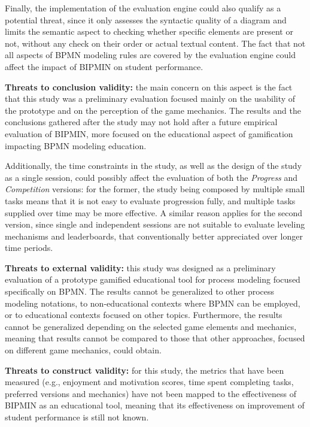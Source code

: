 Finally, the implementation of the evaluation engine could also qualify as a potential threat, since it only assesses the syntactic quality of a diagram and limits the semantic aspect to checking whether specific elements are present or not, without any check on their order or actual textual content. The fact that not all aspects of BPMN modeling rules are covered by the evaluation engine could affect the impact of BIPMIN on student performance.

\textbf{Threats to conclusion validity:} the main concern on this aspect is the fact that this study was a preliminary evaluation focused mainly on the usability of the prototype and on the perception of the game mechanics. The results and the conclusions gathered after the study may not hold after a future empirical evaluation of BIPMIN, more focused on the educational aspect of gamification impacting BPMN modeling education.

Additionally, the time constraints in the study, as well as the design of the study as a single session, could possibly affect the evaluation of both the \textit{Progress} and \textit{Competition} versions: for the former, the study being composed by multiple small tasks means that it is not easy to evaluate progression fully, and multiple tasks supplied over time may be more effective. A similar reason applies for the second version, since single and independent sessions are not suitable to evaluate leveling mechanisms and leaderboards, that conventionally better appreciated over longer time periods.

\textbf{Threats to external validity:} this study was designed as a preliminary evaluation of a prototype gamified educational tool for process modeling focused specifically on BPMN. The results cannot be generalized to other process modeling notations, to non-educational contexts where BPMN can be employed, or to educational contexts focused on other topics. Furthermore, the results cannot be generalized depending on the selected game elements and mechanics, meaning that results cannot be compared to those that other approaches, focused on different game mechanics, could obtain.

\textbf{Threats to construct validity:} for this study, the metrics that have been measured (e.g., enjoyment and motivation scores, time spent completing tasks, preferred versions and mechanics) have not been mapped to the effectiveness of BIPMIN as an educational tool, meaning that its effectiveness on improvement of student performance is still not known.


